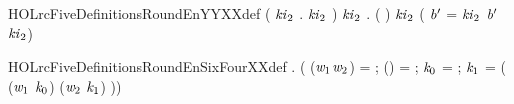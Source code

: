 \newcommand{\HOLrcFiveDefinitionsRoundDeSgXXdef}{\UseVerbatim{HOLrcFiveDefinitionsRoundDeSgXXdef}}
\begin{SaveVerbatim}{HOLrcFiveDefinitionsRoundEnYYXXdef}
\HOLTokenTurnstile{} (\HOLSymConst{\HOLTokenForall{}} \ensuremath{\HOLBoundVar{ki}\sb{\mathrm{2}}} .    \ensuremath{\HOLBoundVar{ki}\sb{\mathrm{2}}}  \HOLSymConst{=} ) \HOLSymConst{\HOLTokenConj{}}
   \HOLSymConst{\HOLTokenForall{}}  \ensuremath{\HOLBoundVar{ki}\sb{\mathrm{2}}} .
      ( )  \ensuremath{\HOLBoundVar{ki}\sb{\mathrm{2}}}  \HOLSymConst{=}
     ( \ensuremath{\HOLBoundVar{b}\sp{\prime{}}} =    \ensuremath{\HOLBoundVar{ki}\sb{\mathrm{2}}}    \ensuremath{\HOLBoundVar{b}\sp{\prime{}}}  \ensuremath{\HOLBoundVar{ki}\sb{\mathrm{2}}})
\end{SaveVerbatim}
\newcommand{\HOLrcFiveDefinitionsRoundEnYYXXdef}{\UseVerbatim{HOLrcFiveDefinitionsRoundEnYYXXdef}}
\begin{SaveVerbatim}{HOLrcFiveDefinitionsRoundEnSixFourXXdef}
\HOLTokenTurnstile{} \HOLSymConst{\HOLTokenForall{}}  .
         \HOLSymConst{=}
     (
        (\ensuremath{\HOLBoundVar{w}\sb{\mathrm{1}}}\HOLSymConst{,}\ensuremath{\HOLBoundVar{w}\sb{\mathrm{2}}}) =  ;
        (\HOLSymConst{,}\HOLSymConst{,}\HOLSymConst{,}\HOLSymConst{,}\HOLSymConst{,}) =   ;
        \ensuremath{\HOLBoundVar{k}\sb{\mathrm{0}}} =   ;
        \ensuremath{\HOLBoundVar{k}\sb{\mathrm{1}}} =   
         (  (\ensuremath{\HOLBoundVar{w}\sb{\mathrm{1}}} \HOLSymConst{\ensuremath{+}} \ensuremath{\HOLBoundVar{k}\sb{\mathrm{0}}}) (\ensuremath{\HOLBoundVar{w}\sb{\mathrm{2}}} \HOLSymConst{\ensuremath{+}} \ensuremath{\HOLBoundVar{k}\sb{\mathrm{1}}}) ))
\end{SaveVerbatim}
\newcommand{\HOLrcFiveDefinitionsRoundEnSixFourXXdef}{\UseVerbatim{HOLrcFiveDefinitionsRoundEnSixFourXXdef}}
